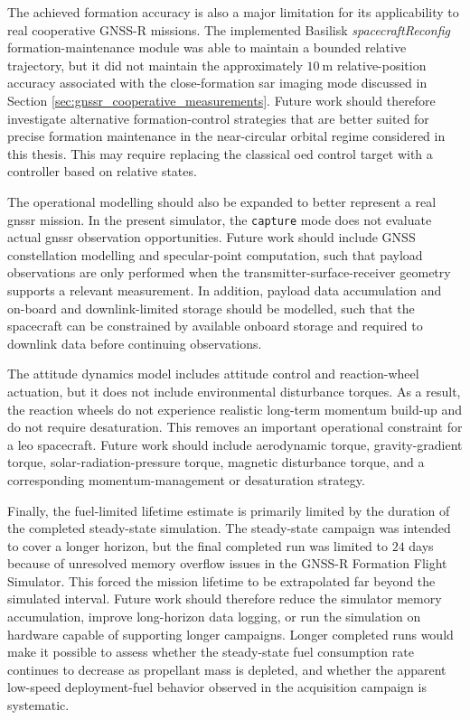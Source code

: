 The achieved formation accuracy is also a major limitation for its applicability to real cooperative GNSS-R missions. The implemented Basilisk \textit{spacecraftReconfig} formation-maintenance module was able to maintain a bounded relative trajectory, but it did not maintain the approximately $10~\mathrm{m}$ relative-position accuracy associated with the close-formation \gls{sar} imaging mode discussed in Section \ref{sec:gnssr_cooperative_measurements}. Future work should therefore investigate alternative formation-control strategies that are better suited for precise formation maintenance in the near-circular orbital regime considered in this thesis. This may require replacing the classical \gls{oed} control target with a controller based on relative states.

The operational modelling should also be expanded to better represent a real \gls{gnssr} mission. In the present simulator, the \texttt{capture} mode does not evaluate actual \gls{gnssr} observation opportunities. Future work should include GNSS constellation modelling and specular-point computation, such that payload observations are only performed when the transmitter-surface-receiver geometry supports a relevant measurement. In addition, payload data accumulation and on-board and downlink-limited storage should be modelled, such that the spacecraft can be constrained by available onboard storage and required to downlink data before continuing observations.

The attitude dynamics model includes attitude control and reaction-wheel actuation, but it does not include environmental disturbance torques. As a result, the reaction wheels do not experience realistic long-term momentum build-up and do not require desaturation. This removes an important operational constraint for a \gls{leo} spacecraft. Future work should include aerodynamic torque, gravity-gradient torque, solar-radiation-pressure torque, magnetic disturbance torque, and a corresponding momentum-management or desaturation strategy. 

Finally, the fuel-limited lifetime estimate is primarily limited by the duration of the completed steady-state simulation. The steady-state campaign was intended to cover a longer horizon, but the final completed run was limited to $24$ days because of unresolved memory overflow issues in the GNSS-R Formation Flight Simulator. This forced the mission lifetime to be extrapolated far beyond the simulated interval. Future work should therefore reduce the simulator memory accumulation, improve long-horizon data logging, or run the simulation on hardware capable of supporting longer campaigns. Longer completed runs would make it possible to assess whether the steady-state fuel consumption rate continues to decrease as propellant mass is depleted, and whether the apparent low-speed deployment-fuel behavior observed in the acquisition campaign is systematic.


